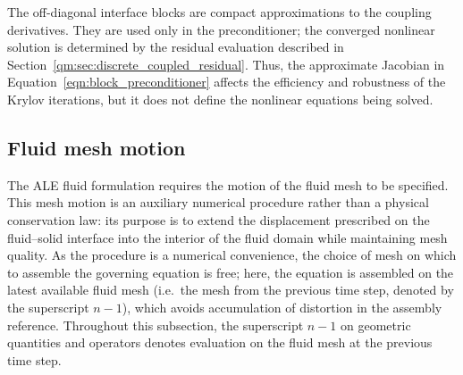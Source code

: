 
The off-diagonal interface blocks are compact approximations to the coupling
derivatives. They are used only in the preconditioner; the converged nonlinear
solution is determined by the residual evaluation described in
Section~\ref{qm:sec:discrete_coupled_residual}. Thus, the approximate Jacobian in
Equation~\eqref{eqn:block_preconditioner} affects the efficiency and robustness
of the Krylov iterations, but it does not define the nonlinear equations being
solved.


\subsection{Fluid mesh motion}
\label{qm:sec:fluid_mesh_motion}

The ALE fluid formulation requires the motion of the fluid mesh to be specified.
This mesh motion is an auxiliary numerical procedure rather than a physical
conservation law: its purpose is to extend the displacement prescribed on the
fluid--solid interface into the interior of the fluid domain while maintaining
mesh quality.
As the procedure is a numerical convenience, the choice of mesh on which to assemble the governing equation is free; here, the equation is assembled on the latest available fluid mesh (i.e.\ the mesh from the previous time step, denoted by the superscript $n-1$), which avoids accumulation of distortion in the assembly reference.
Throughout this subsection, the superscript $n-1$ on geometric quantities and operators denotes evaluation on the fluid mesh at the previous time step.

